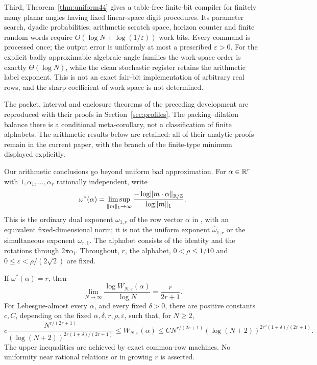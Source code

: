 Third, Theorem~\ref{thm:uniform44} gives a table-free finite-bit compiler
for finitely many planar angles having fixed linear-space digit
procedures. Its parameter search, dyadic probabilities, arithmetic
scratch space, horizon counter and finite random words require
$O(\log N+\log(1/\varepsilon))$ work bits. Every command is processed
once; the output error is uniformly at most a prescribed
$\varepsilon>0$. For the explicit badly approximable algebraic-angle
families the work-space order is exactly $\Theta(\log N)$, while the
clean stochastic register retains the arithmetic label exponent.
This is not an exact fair-bit implementation of arbitrary real rows,
and the sharp coefficient of work space is not determined.

The packet, interval and enclosure theorems of the preceding development
are reproduced with their proofs in Section~\ref{sec:profiles}.
The packing--dilation balance there is a conditional meta-corollary,
not a classification of finite alphabets. The arithmetic results below
are retained: all of their analytic proofs remain in the current paper,
with the branch of the finite-type minimum displayed explicitly.

Our arithmetic conclusions go beyond uniform bad approximation. For $\alpha\in\mathbb R^r$ with $1,\alpha_1,\ldots,\alpha_r$ rationally independent, write
\begin{equation}\label{eq:type-intro}
 \omega^*(\alpha)=\limsup_{\lVert m\rVert_1\to\infty}
       \frac{-\log\lVert m\cdot\alpha\rVert_{\mathbb R/\mathbb Z}}{\log\lVert m\rVert_1}.
\end{equation}
This is the ordinary dual exponent $\omega_{1,r}$ of the row vector $\alpha$ in \cite[Definition 1]{BL06}, with an equivalent fixed-dimensional norm; it is not the uniform exponent $\widehat\omega_{1,r}$ or the simultaneous exponent $\omega_{r,1}$. The alphabet consists of the identity and the rotations through $2\pi\alpha_i$. Throughout, $r$, the alphabet, $0<\rho\le1/10$ and
$0\le\varepsilon<\rho/(2\sqrt2)$ are fixed.

\begin{theorem}\label{thm:metric-main}
If $\omega^*(\alpha)=r$, then
\begin{equation}\label{eq:log-law}
 \lim_{N\to\infty}\frac{\log W_{N,\varepsilon}(\alpha)}{\log N}
                         =\frac{r}{2r+1}.
\end{equation}
For Lebesgue-almost every $\alpha$, and every fixed $\delta>0$, there are positive constants $c,C$, depending on the fixed $\alpha,\delta,r,\rho,\varepsilon$, such that, for $N\ge2$,
\begin{equation}\label{eq:ae-log-bounds}
 c\frac{N^{r/(2r+1)}}{(\log(N+2))^{2r(1+\delta)/(2r+1)}}
 \le W_{N,\varepsilon}(\alpha)
 \le C N^{r/(2r+1)}(\log(N+2))^{2r^2(1+\delta)/(2r+1)}.
\end{equation}
The upper inequalities are achieved by exact common-row machines. No uniformity near rational relations or in growing $r$ is asserted.
\end{theorem}

